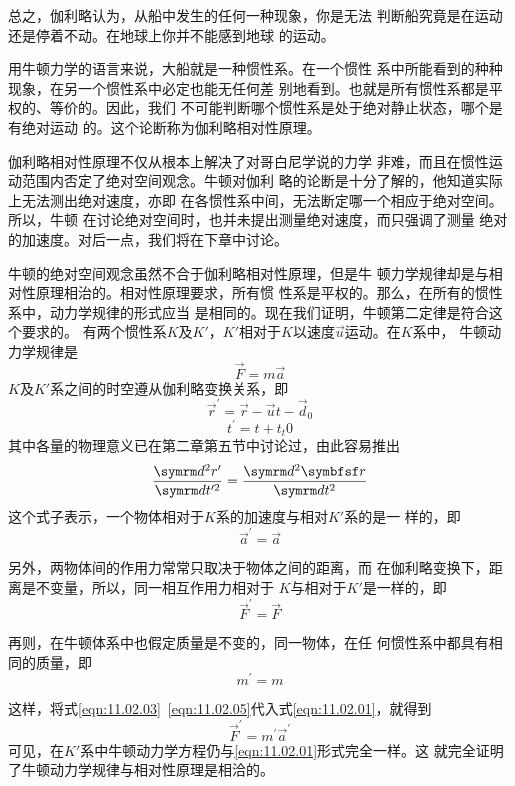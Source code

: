 总之，伽利略认为，从船中发生的任何一种现象，你是无法
判断船究竟是在运动还是停着不动。在地球上你并不能感到地球
的运动。

用牛顿力学的语言来说，大船就是一种惯性系。在一个惯性
系中所能看到的种种现象，在另一个惯性系中必定也能无任何差
别地看到。也就是所有惯性系都是平权的、等价的。因此，我们
不可能判断哪个惯性系是处于绝对静止状态，哪个是有绝对运动
的。这个论断称为伽利略相对性原理。

伽利略相对性原理不仅从根本上解决了对哥白尼学说的力学
非难，而且在惯性运动范围内否定了绝对空间观念。牛顿对伽利
略的论断是十分了解的，他知道实际上无法测出绝对速度，亦即
在各惯性系中间，无法断定哪一个相应于绝对空间。所以，牛顿
在讨论绝对空间时，也并未提出测量绝对速度，而只强调了测量
绝对的加速度。对后一点，我们将在下章中讨论。

牛顿的绝对空间观念虽然不合于伽利略相对性原理，但是牛
顿力学规律却是与相对性原理相治的。相对性原理要求，所有惯
性系是平权的。那么，在所有的惯性系中，动力学规律的形式应当
是相同的。现在我们证明，牛顿第二定律是符合这个要求的。
有两个惯性系$ K $及$ K' $，$ K' $相对于$ K $以速度$ \vec{u} $运动。在$ K $系中，
牛顿动力学规律是
\begin{equation}\label{eqn:11.02.01}
    \vec{F} = m \vec{a}
\end{equation}
$ K $及$ K' $系之间的时空遵从伽利略变换关系，即
\begin{equation}\label{eqn:11.02.02}
    \vec{r} ^ { \prime } = \vec{r} - \vec{u} t - \vec{d} _ { 0 }
\end{equation}
\begin{equation*}
    t ^ { \prime } = t + t _t { 0 }
\end{equation*}
其中各量的物理意义已在第二章第五节中讨论过，由此容易推出
\begin{equation*}
    \frac { \dif ^ { 2 } r ^ { \prime } } { \dif t ^ { \prime 2 } } = \frac { \dif ^ { 2 } \vec{r} } { \dif t ^ { 2 } }
\end{equation*}
这个式子表示，一个物体相对于$ K $系的加速度与相对$ K' $系的是一
样的，即
\begin{equation}\label{eqn:11.02.03}
    \vec{a} ^ { \prime } = \vec{a}
\end{equation}

另外，两物体间的作用力常常只取决于物体之间的距离，而
在伽利略变换下，距离是不变量，所以，同一相互作用力相对于
$ K $与相对于$ K' $是一样的，即
\begin{equation}\label{eqn:11.02.04}
    \vec{F} ^ { \prime } = \vec{F}
\end{equation}

再则，在牛顿体系中也假定质量是不变的，同一物体，在任
何惯性系中都具有相同的质量，即
\begin{equation}\label{eqn:11.02.05}
    m ^ { \prime } = m
\end{equation}

这样，将式\eqref{eqn:11.02.03}~\eqref{eqn:11.02.05}代入式\eqref{eqn:11.02.01}，就得到
\begin{equation}\label{eqn:11.02.06}
    \vec{F} ^ { \prime } = m ^ { \prime } \vec{a} ^ { \prime }
\end{equation}
可见，在$ K' $系中牛顿动力学方程仍与\eqref{eqn:11.02.01}形式完全一样。这
就完全证明了牛顿动力学规律与相对性原理是相洽的。